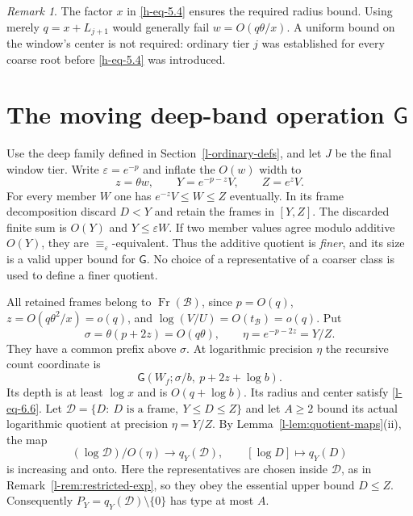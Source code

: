 \documentclass[11pt]{article}
\theoremstyle{definition}
\theoremstyle{remark}
\newtheorem{remark}[theorem]{Remark}
\newcommand{\Fr}{\operatorname{Fr}}
\newcommand{\GG}{\mathsf G}
\newcommand{\calB}{\mathcal B}
\numberwithin{equation}{section}
\begin{document}
\begin{remark}
The factor \(x\) in \eqref{h-eq-5.4} ensures the required radius bound.
Using merely \(q=x+L_{j+1}\) would generally fail
\(w=O(q\theta/x)\). A uniform bound on the window's center is
not required: ordinary tier \(j\) was established for every
coarse root before \eqref{h-eq-5.4} was introduced.
\end{remark}



\section{The moving deep-band operation \texorpdfstring{$\GG$}{G}}\label{l-sec:G}

Use the deep family defined in Section~\ref{l-ordinary-defs},
and let $J$ be the final window tier. Write $\varepsilon=e^{-p}$ and inflate the $O(w)$ width to
\begin{equation}
 z=\theta w,\qquad
 Y=e^{-p-z}V,\qquad Z=e^zV.
 \label{l-eq-6.21}
\end{equation}
For every member $W$ one has $e^{-z}V\le W\le Z$ eventually.
In its frame decomposition discard $D<Y$ and retain the frames
in $[Y,Z]$.  The discarded finite sum is $O(Y)$ and
$Y\le\varepsilon W$.
If two member values agree modulo additive $O(Y)$, they are
$\equiv_\varepsilon$-equivalent.  Thus the additive quotient is
\emph{finer}, and its size is a valid upper bound for $\GG$.
No choice of a representative of a coarser class is used to define
a finer quotient.

All retained frames belong to $\Fr(\calB)$, since
$p=O(q)$, $z=O(q\theta^2/x)=o(q)$, and
$\log(V/U)=O(t_{\calB})=o(q)$.
Put
\begin{equation}
 \sigma=\theta(p+2z)=O(q\theta),\qquad
 \eta=e^{-p-2z}=Y/Z.
 \label{l-eq-6.22}
\end{equation}
They have a common prefix above $\sigma$.
At logarithmic precision $\eta$ the recursive count coordinate is
\begin{equation}
 \GG(W_f;\sigma/b,\ p+2z+\log b).
 \label{l-eq-6.23}
\end{equation}
Its depth is at least $\log x$ and is $O(q+\log b)$.
Its radius and center satisfy \eqref{l-eq-6.6}.
Let $\mathcal D=\{D:\ D\text{ is a frame},\ Y\le D\le Z\}$
and let $A\ge2$ bound its actual logarithmic quotient at precision
$\eta=Y/Z$.  By Lemma~\ref{l-lem:quotient-maps}(ii), the map
\[
 (\log\mathcal D)/O(\eta)\longrightarrow q_Y(\mathcal D),
 \qquad [\log D]\longmapsto q_Y(D)
\]
is increasing and onto.  Here the representatives are chosen
inside $\mathcal D$, as in Remark~\ref{l-rem:restricted-exp},
so they obey the essential upper bound $D\le Z$.
Consequently $P_Y=q_Y(\mathcal D)\setminus\{0\}$ has type
at most $A$.
\end{document}
